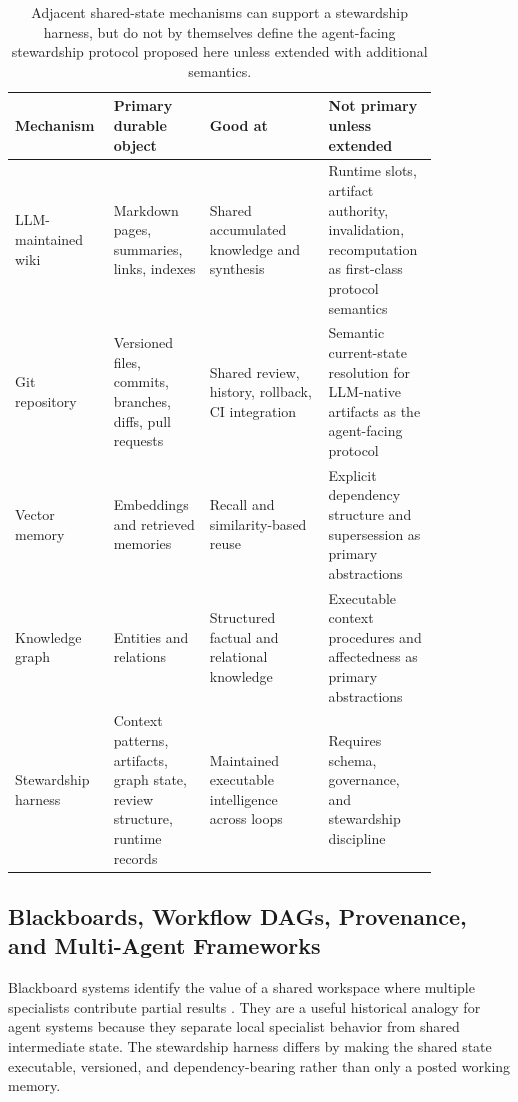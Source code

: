 \documentclass{article}
\begin{document}
\begin{table}[H]
\centering
\scriptsize
\begin{tabular}{p{0.16\linewidth}p{0.21\linewidth}p{0.26\linewidth}p{0.21\linewidth}}
\toprule
\textbf{Mechanism} & \textbf{Primary durable object} & \textbf{Good at} & \textbf{Not primary unless extended} \\
\midrule
LLM-maintained wiki & Markdown pages, summaries, links, indexes & Shared accumulated knowledge and synthesis & Runtime slots, artifact authority, invalidation, recomputation as first-class protocol semantics \\
Git repository & Versioned files, commits, branches, diffs, pull requests & Shared review, history, rollback, CI integration & Semantic current-state resolution for LLM-native artifacts as the agent-facing protocol \\
Vector memory & Embeddings and retrieved memories & Recall and similarity-based reuse & Explicit dependency structure and supersession as primary abstractions \\
Knowledge graph & Entities and relations & Structured factual and relational knowledge & Executable context procedures and affectedness as primary abstractions \\
Stewardship harness & Context patterns, artifacts, graph state, review structure, runtime records & Maintained executable intelligence across loops & Requires schema, governance, and stewardship discipline \\
\bottomrule
\end{tabular}
\caption{Adjacent shared-state mechanisms can support a stewardship harness, but do not by themselves define the agent-facing stewardship protocol proposed here unless extended with additional semantics.}
\label{tab:shared-state-mechanisms}
\end{table}

\subsection{Blackboards, Workflow DAGs, Provenance, and Multi-Agent Frameworks}

Blackboard systems identify the value of a shared workspace where multiple specialists contribute partial results \cite{nii1986blackboard}. They are a useful historical analogy for agent systems because they separate local specialist behavior from shared intermediate state. The stewardship harness differs by making the shared state executable, versioned, and dependency-bearing rather than only a posted working memory.
\end{document}
